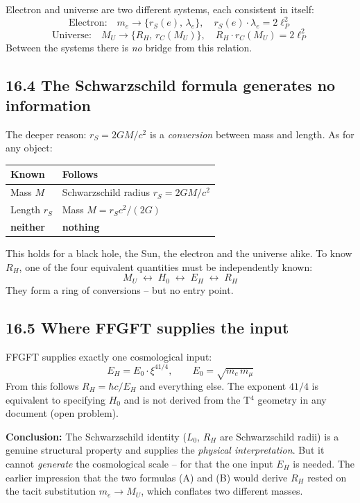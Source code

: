 Electron and universe are two different systems, each consistent in
itself:
\[
  \text{Electron:}\quad m_e \to \{r_S(e),\,\lambda_e\},
  \quad r_S(e)\cdot\lambda_e = 2\ell_P^2
\]
\[
  \text{Universe:}\quad M_U \to \{R_H,\,r_C(M_U)\},
  \quad R_H\cdot r_C(M_U) = 2\ell_P^2
\]
Between the systems there is \emph{no} bridge from this relation.

\subsection*{16.4 The Schwarzschild formula generates no information}

The deeper reason: $r_S = 2GM/c^2$ is a \emph{conversion}
between mass and length. As for any object:

\begin{center}
\begin{tabular}{p{4cm}p{8cm}}
\toprule
\textbf{Known} & \textbf{Follows} \\
\midrule
Mass $M$ & Schwarzschild radius $r_S = 2GM/c^2$ \\
Length $r_S$ & Mass $M = r_S c^2/(2G)$ \\
\textbf{neither} & \textbf{nothing} \\
\bottomrule
\end{tabular}
\end{center}

This holds for a black hole, the Sun, the electron and the
universe alike. To know $R_H$, one of the four equivalent
quantities must be independently known:
\[
  M_U \;\longleftrightarrow\; H_0 \;\longleftrightarrow\;
  E_H \;\longleftrightarrow\; R_H
\]
They form a ring of conversions -- but no entry point.

\subsection*{16.5 Where FFGFT supplies the input}

FFGFT supplies exactly one cosmological input:
\[
  E_H = E_0\cdot\xi^{41/4}, \qquad E_0 = \sqrt{m_e\,m_\mu}
\]
From this follows $R_H = \hbar c/E_H$ and everything else. The exponent
$41/4$ is equivalent to specifying $H_0$ and is not derived from the
T$^4$ geometry in any document (open problem).

\textbf{Conclusion:} The Schwarzschild identity ($L_0$, $R_H$ are
Schwarzschild radii) is a genuine structural property and supplies
the \emph{physical interpretation}. But it cannot \emph{generate}
the cosmological scale -- for that the one input $E_H$ is needed.
The earlier impression that the two formulas (A) and (B) would derive
$R_H$ rested on the tacit substitution $m_e \to M_U$, which conflates
two different masses.

